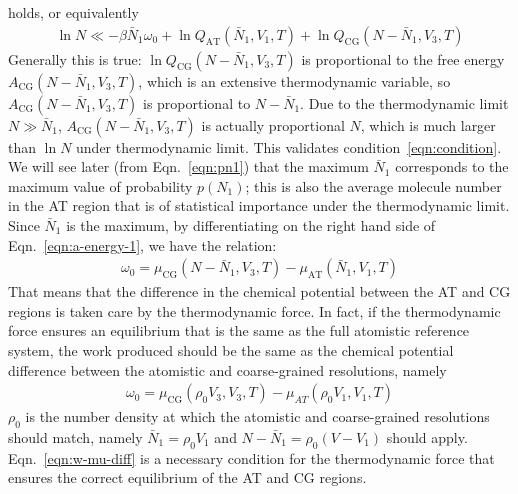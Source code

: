 \documentclass[aip,jcp,a4paper,reprint,onecolumn]{revtex4-1}
\newcommand{\recheck}[1]{{\color{red} #1}}
\newcommand{\AT}{{\textrm{{AT}}}}
\newcommand{\CG}{{\textrm{CG}}}
\begin{document}
holds, or equivalently
\begin{align}\label{eqn:condition}
  \ln N 
  \ll
  -\beta \bar N_1\omega_0 +
  \ln Q_{\AT}(\bar N_1, V_1, T) + \ln Q_{\CG}(N - \bar N_1, V_3, T)
\end{align}
Generally this is true: $\ln Q_{\CG}(N - \bar N_1, V_3, T)$
is proportional to the free energy $A_{\CG}(N - \bar N_1, V_3, T)$,
which is an extensive thermodynamic variable, so
$A_{\CG}(N - \bar N_1, V_3, T)$ is proportional to $N-\bar N_1$.
Due to the thermodynamic limit $N \gg \bar N_1$,
$A_{\CG}(N - \bar N_1, V_3, T)$ is actually proportional $N$, which
is much larger than $\ln N$ under thermodynamic limit. This
validates condition~\eqref{eqn:condition}.
We will see later (from Eqn.~\eqref{eqn:pn1})
that the maximum $\bar N_1$ corresponds to the maximum
value of probability $p(N_1)$; this is also the average molecule
number in the AT region that is of statistical importance
under the thermodynamic limit.  Since $\bar
N_1$ is the maximum, by differentiating on the right hand side of
Eqn.~\eqref{eqn:a-energy-1}, we have the relation:
\begin{align}
  \omega_0 = \mu_{\CG}(N - \bar N_1, V_3, T)  - \mu_{\AT}(\bar N_1, V_1, T)
\end{align}
That means that the difference in the chemical potential between the AT and CG
regions is taken care by the thermodynamic force.
In fact, if the thermodynamic force ensures an
equilibrium that is the same as the full atomistic reference system,
the work produced should be the same as the
chemical potential difference between the atomistic and coarse-grained
resolutions, namely
\begin{align}\label{eqn:w-mu-diff}
  \omega_0 = \mu_{\CG}(\rho_0V_3, V_3, T) - \mu_{AT}(\rho_0 V_1, V_1, T)
\end{align}
$\rho_0$ is the number density at which the atomistic and coarse-grained
resolutions should match,
namely $\bar N_1 = \rho_0V_1$ and $N - \bar N_1 = \rho_0(V - V_1)$ should apply.
Eqn.~\eqref{eqn:w-mu-diff} is a necessary
condition for the thermodynamic force that ensures
the correct equilibrium of the AT and CG regions.\\
\end{document}

